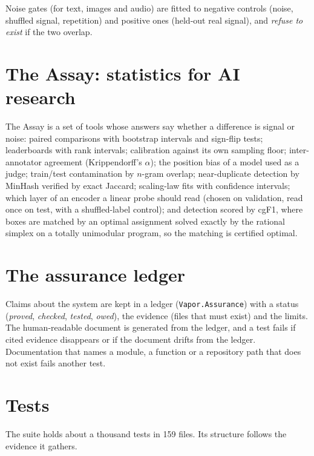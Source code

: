 Noise gates (for text, images and audio) are fitted to negative controls (noise, shuffled signal,
repetition) and positive ones (held-out real signal), and \emph{refuse to exist} if the two overlap.

\section{The Assay: statistics for AI research}

The Assay is a set of tools whose answers say whether a difference is signal or noise: paired
comparisons with bootstrap intervals and sign-flip tests; leaderboards with rank intervals; calibration
against its own sampling floor; inter-annotator agreement (Krippendorff's $\alpha$); the position bias of
a model used as a judge; train/test contamination by $n$-gram overlap; near-duplicate detection by MinHash
verified by exact Jaccard; scaling-law fits with confidence intervals; which layer of an encoder a linear
probe should read (chosen on validation, read once on test, with a shuffled-label control); and detection
scored by cgF1, where boxes are matched by an optimal assignment solved exactly by the rational simplex
on a totally unimodular program, so the matching is certified optimal.

\section{The assurance ledger}

Claims about the system are kept in a ledger (\texttt{Vapor.Assurance}) with a status (\emph{proved},
\emph{checked}, \emph{tested}, \emph{owed}), the evidence (files that must exist) and the limits. The
human-readable document is generated from the ledger, and a test fails if cited evidence disappears or if
the document drifts from the ledger. Documentation that names a module, a function or a repository path
that does not exist fails another test.

\section{Tests}

The suite holds about a thousand tests in 159 files. Its structure follows the evidence it gathers.

